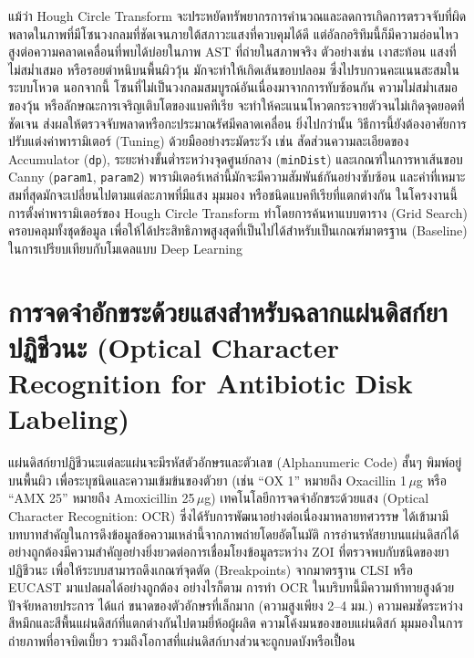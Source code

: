 แม้ว่า Hough Circle Transform จะประหยัดทรัพยากรการคำนวณและลดการเกิดการตรวจจับที่ผิดพลาดในภาพที่มีโซนวงกลมที่ชัดเจนภายใต้สภาวะแสงที่ควบคุมได้ดี แต่อัลกอริทึมนี้ก็มีความอ่อนไหวสูงต่อความคลาดเคลื่อนที่พบได้บ่อยในภาพ AST ที่ถ่ายในสภาพจริง ตัวอย่างเช่น เงาสะท้อน แสงที่ไม่สม่ำเสมอ หรือรอยตำหนิบนพื้นผิววุ้น มักจะทำให้เกิดเส้นขอบปลอม ซึ่งไปรบกวนคะแนนสะสมในระบบโหวต นอกจากนี้ โซนที่ไม่เป็นวงกลมสมบูรณ์อันเนื่องมาจากการทับซ้อนกัน ความไม่สม่ำเสมอของวุ้น หรือลักษณะการเจริญเติบโตของแบคทีเรีย จะทำให้คะแนนโหวตกระจายตัวจนไม่เกิดจุดยอดที่ชัดเจน ส่งผลให้ตรวจจับพลาดหรือกะประมาณรัศมีคลาดเคลื่อน ยิ่งไปกว่านั้น วิธีการนี้ยังต้องอาศัยการปรับแต่งค่าพารามิเตอร์ (Tuning) ด้วยมืออย่างระมัดระวัง เช่น สัดส่วนความละเอียดของ Accumulator (\texttt{dp}), ระยะห่างขั้นต่ำระหว่างจุดศูนย์กลาง (\texttt{minDist}) และเกณฑ์ในการหาเส้นขอบ Canny (\texttt{param1}, \texttt{param2}) พารามิเตอร์เหล่านี้มักจะมีความสัมพันธ์กันอย่างซับซ้อน และค่าที่เหมาะสมที่สุดมักจะเปลี่ยนไปตามแต่ละภาพที่มีแสง มุมมอง หรือชนิดแบคทีเรียที่แตกต่างกัน ในโครงงานนี้ การตั้งค่าพารามิเตอร์ของ Hough Circle Transform ทำโดยการค้นหาแบบตาราง (Grid Search) ครอบคลุมทั้งชุดข้อมูล เพื่อให้ได้ประสิทธิภาพสูงสุดที่เป็นไปได้สำหรับเป็นเกณฑ์มาตรฐาน (Baseline) ในการเปรียบเทียบกับโมเดลแบบ Deep Learning

\section{การจดจำอักขระด้วยแสงสำหรับฉลากแผ่นดิสก์ยาปฏิชีวนะ (Optical Character Recognition for Antibiotic Disk Labeling)}

แผ่นดิสก์ยาปฏิชีวนะแต่ละแผ่นจะมีรหัสตัวอักษรและตัวเลข (Alphanumeric Code) สั้นๆ พิมพ์อยู่บนพื้นผิว เพื่อระบุชนิดและความเข้มข้นของตัวยา (เช่น ``OX 1'' หมายถึง Oxacillin 1\,$\mu$g หรือ ``AMX 25'' หมายถึง Amoxicillin 25\,$\mu$g) เทคโนโลยีการจดจำอักขระด้วยแสง (Optical Character Recognition: OCR) ซึ่งได้รับการพัฒนาอย่างต่อเนื่องมาหลายทศวรรษ \cite{wang2023ocr_history} ได้เข้ามามีบทบาทสำคัญในการดึงข้อมูลข้อความเหล่านี้จากภาพถ่ายโดยอัตโนมัติ การอ่านรหัสยาบนแผ่นดิสก์ได้อย่างถูกต้องมีความสำคัญอย่างยิ่งยวดต่อการเชื่อมโยงข้อมูลระหว่าง ZOI ที่ตรวจพบกับชนิดของยาปฏิชีวนะ เพื่อให้ระบบสามารถดึงเกณฑ์จุดตัด (Breakpoints) จากมาตรฐาน CLSI หรือ EUCAST มาแปลผลได้อย่างถูกต้อง อย่างไรก็ตาม การทำ OCR ในบริบทนี้มีความท้าทายสูงด้วยปัจจัยหลายประการ ได้แก่ ขนาดของตัวอักษรที่เล็กมาก (ความสูงเพียง 2--4 มม.) ความคมชัดระหว่างสีหมึกและสีพื้นแผ่นดิสก์ที่แตกต่างกันไปตามยี่ห้อผู้ผลิต ความโค้งมนของขอบแผ่นดิสก์ มุมมองในการถ่ายภาพที่อาจบิดเบี้ยว รวมถึงโอกาสที่แผ่นดิสก์บางส่วนจะถูกบดบังหรือเปื้อน


